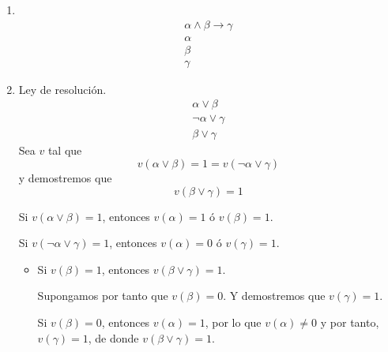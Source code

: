 \begin{ejercicio*}
\begin{enumerate}
    \item \ 
        \begin{equation*}
            \begin{array}{c}
                \alpha\land\beta\rightarrow\gamma \\
                \alpha \\
                \beta \\
                \hline
                \gamma
            \end{array}
        \end{equation*}

    \item Ley de resolución.
        \begin{equation*}
            \begin{array}{c}
                \alpha\lor\beta \\
                \lnot\alpha\lor\gamma \\
                \hline
                \beta\lor\gamma
            \end{array}
        \end{equation*}
        Sea $v$ tal que 
        \begin{equation*}
            v(\alpha\lor\beta) = 1 = v(\lnot\alpha\lor\gamma)
        \end{equation*}
        y demostremos que
        \begin{equation*}
            v(\beta\lor\gamma) = 1
        \end{equation*}

        Si $v(\alpha\lor\beta)=1$, entonces $v(\alpha)=1$ ó $v(\beta)=1$. 

        Si $v(\lnot\alpha\lor\gamma)=1$, entonces $v(\alpha)=0$ ó $v(\gamma)=1$.\\

        \begin{itemize}
            \item Si $v(\beta)=1$, entonces $v(\beta\lor\gamma)=1$. 

                Supongamos por tanto que $v(\beta)=0$. Y demostremos que $v(\gamma)=1$.

                Si $v(\beta)=0$, entonces $v(\alpha)=1$, por lo que $v(\alpha)\neq 0$ y por tanto, $v(\gamma)=1$, de donde $v(\beta\lor\gamma)=1$.
        \end{itemize}


\end{enumerate}
\end{ejercicio*}
